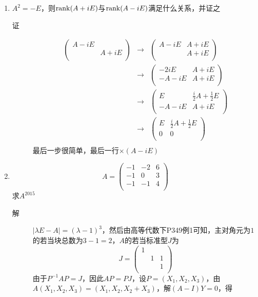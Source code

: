 \begin{enumerate}
\item $A^2 = -E$，则$\operatorname{rank}(A+iE)$与$\operatorname{rank}(A-iE)$满足什么关系，并证之
\begin{description}
\item[证] 
\begin{eqnarray*}
\left(
\begin{array}{cc}
A-iE & \\
 & A+iE \\
\end{array}
\right) & \rightarrow & \left(
\begin{array}{cc}
A-iE & A+iE\\
 & A+iE \\
\end{array}
\right) \\
& \rightarrow & \left(
\begin{array}{cc}
-2iE & A+iE\\
-A-iE & A+iE\\
\end{array}
\right) \\
& \rightarrow & \left(
\begin{array}{cc}
E & \frac{i}{2}A+\frac{1}{2}E\\
-A-iE & A+iE\\
\end{array}
\right) \\
& \rightarrow & \left(
\begin{array}{cc}
E & \frac{i}{2}A+\frac{1}{2}E\\
0 & 0 \\
\end{array}
\right) \\
\end{eqnarray*}
最后一步很简单，最后一行$\times(A-iE)$
\end{description}

\item
\[
A = \left(
\begin{array}{ccc}
-1 & -2 & 6 \\
-1 & 0 & 3 \\
-1 & -1 & 4 \\
\end{array}
\right)
\]
求$A^{2015}$
\begin{description}
\item[解] $|\lambda E-A|=(\lambda-1)^3$，然后由高等代数下P349例1可知，主对角元为$1$的若当块总数为$3-1=2$，$A$的若当标准型$J$为
\[
J = \left(
\begin{array}{ccc}
1 & & \\
 & 1 & 1\\
 &  & 1 \\
\end{array}
\right)
\]
由于$P^{-1}AP=J$，因此$AP=PJ$，设$P=(X_1,X_2,X_3)$，由$A(X_1,X_2,X_3)=(X_1,X_2,X_2+X_3)$，解$(A-I)Y=0$，得
\end{description}


\end{enumerate}
